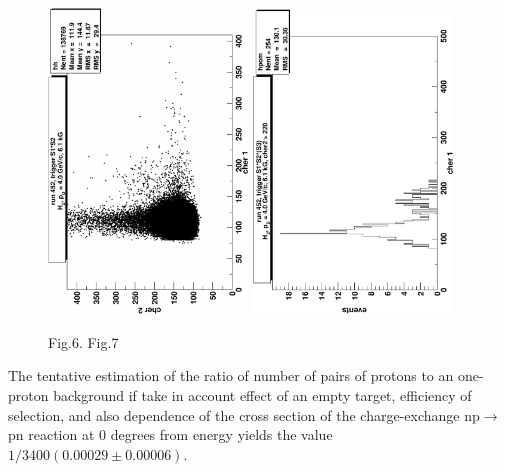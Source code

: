 \documentclass[a4paper,12pt]{article}
\begin{document}
\begin{figure}[hbt]
  \begin{center}
    \includegraphics[width=5.3cm,angle=270]{plot.pdf}
    \includegraphics[width=5.3cm,angle=270]{proj.pdf}
  \end{center}
  \vspace{0,4mm}
  \noindent
  \hspace{3cm} Fig.6.\hspace{6cm} Fig.7 \\
\end{figure}


The tentative estimation of the ratio of number of pairs of protons to an one-
proton background if take in account effect of an empty target, efficiency of
selection, and also dependence  of the cross section  of the charge-exchange
np$\to$pn reaction at 0 degrees from energy yields the value
$1/3400 (0.00029\pm0.00006)$.
\end{document}
